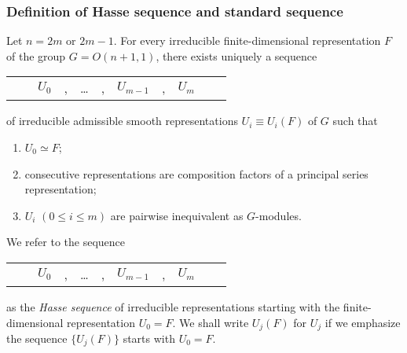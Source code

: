 \subsubsection{Definition of Hasse sequence
 and standard sequence}
\begin{definitiontheorem}
\label{def:UHasse}
Let $n=2m$ or $2m-1$.  
For every irreducible finite-dimensional representation $F$
 of the group $G=O(n+1,1)$,
 there exists uniquely
 a sequence 
\begin{center}
\begin{tabular}{ccccccccccc}
& &$U_0$&, &\dots   & , & $U_{m-1} $ &, & $U_{m}$ 
\end{tabular}
\end{center}
of irreducible admissible smooth representations 
 $U_i\equiv U_i(F)$ of $G$ such that 
\begin{enumerate}
\item  $U_0 \simeq F$; 
\item  consecutive representations are composition factors of a principal series representation;
\item
$U_i$ $(0 \le i \le m)$ are pairwise inequivalent as $G$-modules.  
\end{enumerate}



We refer to the sequence 
\begin{center}
\begin{tabular}{ccccccccccc}
& &$U_0$&, &\dots   & , & $U_{m-1} $ &, & $U_{m}$ 
\end{tabular}
\end{center}
 as the 
{\it {Hasse sequence}}
 of irreducible representations
 starting with the finite-dimensional representation $U_0=F$.  
We shall write $U_j(F)$ for $U_j$
 if we emphasize the sequence $\{U_j(F)\}$
 starts with $U_0=F$.  
\end{definitiontheorem}

